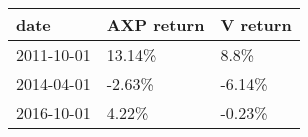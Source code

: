 \begin{tabular}{lll}
\toprule
      date & AXP return & V return \\
\midrule
2011-10-01 &     13.14\% &     8.8\% \\
2014-04-01 &     -2.63\% &   -6.14\% \\
2016-10-01 &      4.22\% &   -0.23\% \\
\bottomrule
\end{tabular}

